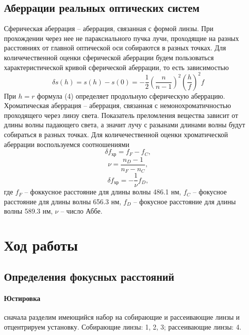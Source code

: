\documentclass[a4paper,12pt]{article}
\begin{document}
\subsection*{Аберрации реальных оптических систем}
Сферическая аберрация -- аберрация, связанная с формой линзы. При прохождении через нее не параксиального пучка лучи, проходящие на разных расстояниях от главной оптической оси собираются в разных точках. Для количечественной оценки сферической аберрации будем пользоваться характеристической кривой сферической аберрации, то есть зависимостью 
\begin{equation}
    \delta s(h) = s(h) - s(0) = -\frac12 \left( \frac{n}{n - 1} \right)^2 \left( \frac{h}{f} \right)^2 f
\end{equation}
\noindent
При $h = r$ формула (4) определяет продольную сферическую аберрацию. \\
Хроматическая аберрация -- аберрация, связанная с немонохроматичностью проходящего через линзу света. Показатель преломления вещества зависит от длины волны падающего света, а значит лучу с разынами длинами волны будут собираться в разных точках. Для количечественной оценки хроматической аберрации воспользуемся соотношениями
\begin{equation}
    \delta f_\text{хр} = f_F - f_C,
\end{equation}
\begin{equation}
    \nu = \frac{n_D - 1}{n_F - n_C},
\end{equation}
\begin{equation}
    \delta f_\text{хр} = -\frac{1}{\nu} f_D,
\end{equation}
\noindent
где $f_F$ -- фоккусное расстояние для длины волны 486.1 нм, $f_C$ -- фокусное расстояние для длины волны 656.3 нм, $f_D$ -- фокусное расстояние для длины волны 589.3 нм, $\nu$ -- число Аббе.


\section*{Ход работы}
\subsection*{Определения фокусных расстояний}
\paragraph{Юстировка} сначала разделим имеющийся набор на собирающие и рассеивающие линзы и отцентрируем установку. Собирающие линзы: 1, 2, 3; рассеивающие линзы: 4.
\end{document}
